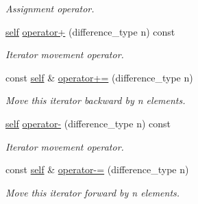 \begin{Indent}
\begin{DoxyCompactItemize}
\begin{DoxyCompactList}\small\item\em Assignment operator. \end{DoxyCompactList}\item 
\mbox{\hyperlink{classGis__wkb__vector__const__iterator}{self}} \mbox{\hyperlink{classGis__wkb__vector__iterator_aabbd4bfbbf7d089178e6491cc5069acf}{operator+}} (difference\+\_\+type n) const
\begin{DoxyCompactList}\small\item\em Iterator movement operator. \end{DoxyCompactList}\item 
const \mbox{\hyperlink{classGis__wkb__vector__const__iterator}{self}} \& \mbox{\hyperlink{classGis__wkb__vector__iterator_a79abfc33a88bf7e7a5c2eb202b0ffcc0}{operator+=}} (difference\+\_\+type n)
\begin{DoxyCompactList}\small\item\em Move this iterator backward by n elements. \end{DoxyCompactList}\item 
\mbox{\hyperlink{classGis__wkb__vector__const__iterator}{self}} \mbox{\hyperlink{classGis__wkb__vector__iterator_a1a8a11a01a931641143844a3075ca41f}{operator-\/}} (difference\+\_\+type n) const
\begin{DoxyCompactList}\small\item\em Iterator movement operator. \end{DoxyCompactList}\item 
const \mbox{\hyperlink{classGis__wkb__vector__const__iterator}{self}} \& \mbox{\hyperlink{classGis__wkb__vector__iterator_ae2eb9ea30d4ce96a9b71abd90586133f}{operator-\/=}} (difference\+\_\+type n)
\begin{DoxyCompactList}\small\item\em Move this iterator forward by n elements. \end{DoxyCompactList}\end{DoxyCompactItemize}
\end{Indent}
